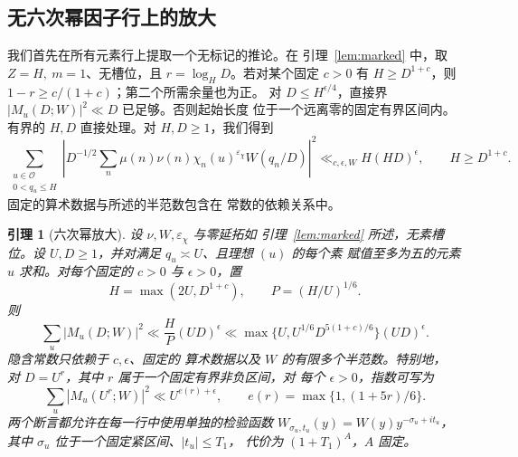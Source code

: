 \documentclass[11pt,a4paper]{article}
\numberwithin{equation}{section}
\numberwithin{figure}{section}
\newtheorem{lemma}[theorem]{引理}
\theoremstyle{definition}
\theoremstyle{remark}
\begin{document}
\subsection{无六次幂因子行上的放大}

我们首先在所有元素行上提取一个无标记的推论。在
引理~\ref{lem:marked} 中，取 \(Z=H,\ m=1\)、无槽位，且
\(r=\log_H D\)。若对某个固定 \(c>0\) 有 \(H\ge D^{1+c}\)，则
\(1-r\ge c/(1+c)\)；第二个所需余量也为正。
对 \(D\le H^{\epsilon/4}\)，直接界
\(|M_u(D;W)|^2\ll D\) 已足够。否则起始长度
位于一个远离零的固定有界区间内。有界的 \(H,D\)
直接处理。对 \(H,D\ge1\)，我们得到
\begin{equation}\label{eq:raw-moment}
 \sum_{\substack{u\in\mathcal O\\0<q_u\le H}}
 \left|D^{-1/2}\sum_n\mu(n)\nu(n)\chi_n(u)^{\varepsilon_\chi}
                         W(q_n/D)\right|^2
 \ll_{c,\epsilon,W} H(HD)^\epsilon,\qquad H\ge D^{1+c}.
\end{equation}
固定的算术数据与所述的半范数包含在
常数的依赖关系中。

\begin{lemma}[六次幂放大]\label{lem:inverse-amplification}
设 \(\nu,W,\varepsilon_\chi\) 与零延拓如
引理~\ref{lem:marked} 所述，无素槽位。设 \(U,D\ge1\)，并对满足
\(q_u\asymp U\)、且理想 \((u)\) 的每个素
赋值至多为五的元素 \(u\) 求和。对每个固定的
\(c>0\) 与 \(\epsilon>0\)，置
\[
 H=\max(2U,D^{1+c}),\qquad P=(H/U)^{1/6}.
\]
则
\begin{equation}\label{eq:amplified-note}
 \sum_u|M_u(D;W)|^2
 \ll \frac HP(UD)^\epsilon
 \ll \max\{U,U^{1/6}D^{5(1+c)/6}\}(UD)^\epsilon.
\end{equation}
隐含常数只依赖于 \(c,\epsilon\)、固定的
算术数据以及 \(W\) 的有限多个半范数。特别地，
对 \(D=U^r\)，其中 \(r\) 属于一个固定有界非负区间，对
每个 \(\epsilon>0\)，指数可写为
\[
 \sum_u|M_u(U^r;W)|^2\ll U^{e(r)+\epsilon},
 \qquad e(r)=\max\{1,(1+5r)/6\}.
\]
两个断言都允许在每一行中使用单独的检验函数
\(W_{\sigma_u,t_u}(y)=W(y)y^{-\sigma_u+it_u}\)，其中
\(\sigma_u\) 位于一个固定紧区间、\(|t_u|\le T_1\)，
代价为 \((1+T_1)^A\)，\(A\) 固定。
\end{lemma}
\end{document}
